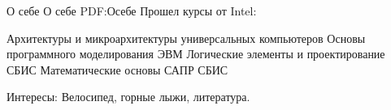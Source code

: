 \documentclass[a4paper, MMyyyy,nonstopmode]{simpleresumecv}
\begin{document}
\begin{Body}

\Section
{О себе}
{О себе}
{PDF:Осебе}
\BulletItem
Прошел курсы от Intel:
\begin{Detail}
\SubBulletItem
Архитектуры и микроархитектуры универсальных компьютеров
\SubBulletItem
Основы программного моделирования ЭВМ
\SubBulletItem
Логические элементы и проектирование СБИС
\SubBulletItem
Математические основы САПР СБИС
\end{Detail}
\Gap
\BulletItem
Интересы:
Велосипед, 
горные лыжи,
литература.






\end{Body}
\end{document}
